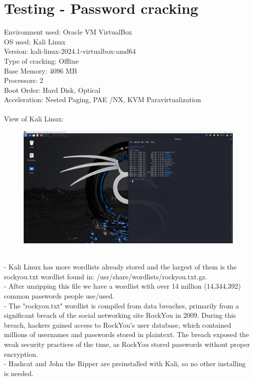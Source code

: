 \documentclass[10pt,oneside,english,a4paper]{article}
\begin{document}
\section{Testing - Password cracking}
Environment used: Oracle VM VirtualBox\\
OS used: \hspace{1.35cm} Kali Linux\\
Version:  \hspace{1.5cm} kali-linux-2024.1-virtualbox-amd64\\
Type of cracking: \hspace{0.05cm} Offline\\
Base Memory: \hspace{0.5cm} 4096 MB\\
Processors: \hspace{1cm} 2\\
Boot Order: \hspace{0.82cm} Hard Disk, Optical\\
Acceleration: \hspace{0.67cm} Nested Paging, PAE /NX, KVM Paravirtualization\\\\
View of Kali Linux:
\begin{figure}[h]
	\centering
	\includegraphics[scale = 0.30]{kali_terminal.png}
\end{figure}\\
- Kali Linux has more wordlists already stored and the largest of them is the rockyou.txt wordlist found in: /usr/share/wordlists/rockyou.txt.gz.\\
- After unzipping this file we have a wordlist with over 14 million (14,344,392) common passwords people use/used.\\
- The "rockyou.txt" wordlist is compiled from data breaches, primarily from a significant breach of the social networking site RockYou in 2009. During this breach, hackers gained access to RockYou's user database, which contained millions of usernames and passwords stored in plaintext. The breach exposed the weak security practices of the time, as RockYou stored passwords without proper encryption.\\
- Hashcat and John the Ripper are preinstalled with Kali, so no other installing is needed.\\
\end{document}
